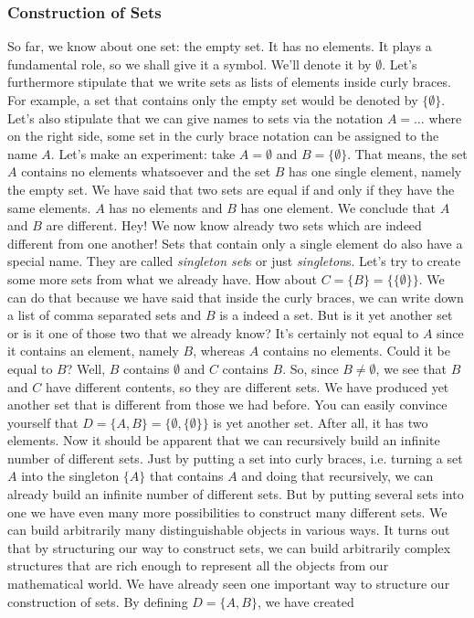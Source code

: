 
\subsubsection{Construction of Sets}
So far, we know about one set: the empty set. It has no elements. It plays a fundamental role, so we shall give it a symbol. We'll denote it by $\emptyset$. Let's furthermore stipulate that we write sets as lists of elements inside curly braces. For example, a set that contains only the empty set would be denoted by $\{ \emptyset \}$. Let's also stipulate that we can give names to sets via the notation $A = \ldots$ where on the right side, some set in the curly brace notation can be assigned to the name $A$. Let's make an experiment: take $A = \emptyset$ and $B = \{ \emptyset \}$. That means, the set $A$ contains no elements whatsoever and the set $B$ has one single element, namely the empty set. We have said that two sets are equal if and only if they have the same elements. $A$ has no elements and $B$ has one element. We conclude that $A$ and $B$ are different. Hey! We now know already two sets which are indeed different from one another! Sets that contain only a single element do also have a special name. They are called \emph{singleton set}s or just \emph{singleton}s. Let's try to create some more sets from what we already have. How about $C = \{ B \} = \{ \{ \emptyset \} \}$. We can do that because we have said that inside the curly braces, we can write down a list of comma separated sets and $B$ is a indeed a set. But is it yet another set or is it one of those two that we already know? It's certainly not equal to $A$ since it contains an element, namely $B$, whereas $A$ contains no elements. Could it be equal to $B$? Well, $B$ contains $\emptyset$ and $C$ contains $B$. So, since $B \neq \emptyset$, we see that $B$ and $C$ have different contents, so they are different sets. We have produced yet another set that is different from those we had before. You can easily convince yourself that $D = \{ A, B\} = \{ \emptyset, \{\emptyset\} \}$ is yet another set. After all, it has two elements. Now it should be apparent that we can recursively build an infinite number of different sets. Just by putting a set into curly braces, i.e. turning a set $A$ into the singleton $\{A\}$ that contains $A$ and doing that recursively, we can already build an infinite number of different sets. But by putting several sets into one we have even many more possibilities to construct many different sets. We can build arbitrarily many distinguishable objects in various ways. It turns out that by structuring our way to construct sets, we can build arbitrarily complex structures that are rich enough to represent all the objects from our mathematical world. We have already seen one important way to structure our construction of sets. By defining $D = \{ A, B \}$, we have created 